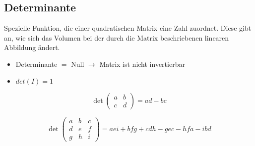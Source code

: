 \subsection{Determinante}

Spezielle Funktion, die einer quadratischen Matrix eine Zahl zuordnet. Diese gibt an, wie sich das Volumen bei der durch die Matrix beschriebenen linearen Abbildung ändert. \\

\begin{itemize}
    \item Determinante \(=\) Null \(\rightarrow\) Matrix ist nicht invertierbar
    \item \(det(I) = 1\)
\end{itemize}



\begin{figure}[H]
    \begin{equation*}
        \det\begin{pmatrix}
        a & b \\
        c & d
        \end{pmatrix}
        = ad - bc
    \end{equation*}
\end{figure}

\begin{figure}[H]
    \begin{equation*}
        \det\begin{pmatrix}
        a & b & c \\
        d & e & f \\
        g & h & i
        \end{pmatrix}
        = aei + bfg + cdh - gec - hfa - ibd
    \end{equation*}
\end{figure}
